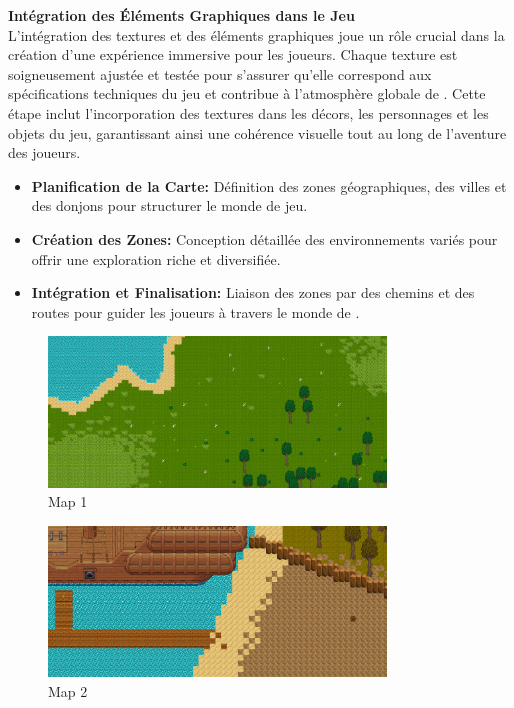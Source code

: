 \textbf{Intégration des Éléments Graphiques dans le Jeu}
\\

L'intégration des textures et des éléments graphiques joue un rôle crucial dans la création d'une expérience immersive pour les joueurs. Chaque texture est soigneusement ajustée et testée pour s'assurer qu'elle correspond aux spécifications techniques du jeu et contribue à l'atmosphère globale de \gameName. Cette étape inclut l'incorporation des textures dans les décors, les personnages et les objets du jeu, garantissant ainsi une cohérence visuelle tout au long de l'aventure des joueurs.
\\

\begin{itemize}

      \item \textbf{Planification de la Carte:} Définition des zones géographiques, des villes et des donjons pour structurer le monde de jeu.
            \\

      \item \textbf{Création des Zones:} Conception détaillée des environnements variés pour offrir une exploration riche et diversifiée.
            \\

      \item \textbf{Intégration et Finalisation:} Liaison des zones par des chemins et des routes pour guider les joueurs à travers le monde de \gameName.
            \\

\end{itemize}



\begin{figure}[H]
      \centering
      \includegraphics[width=0.8\textwidth]{assets/map.png}
      \caption{Map 1}
      \label{fig:website1}
  \end{figure}

  \begin{figure}[H]
      \centering
      \includegraphics[width=0.8\textwidth]{assets/map2.png}
      \caption{Map 2}
      \label{fig:website1}
  \end{figure}

